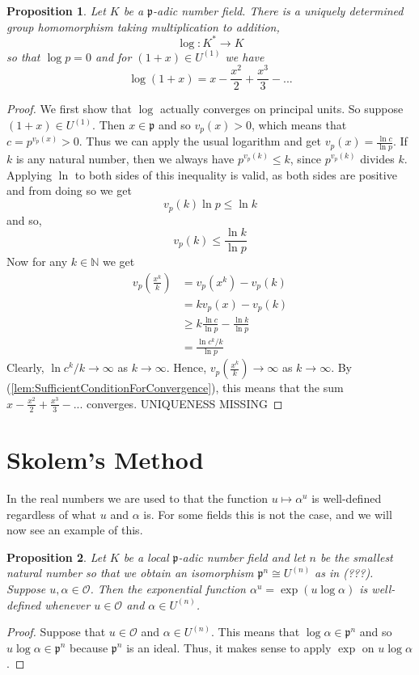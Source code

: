 \documentclass{article}
\newtheorem{proposition}{Proposition}[section]
\newcommand{\mfrak}[1]{\mathfrak{#1}}
\newcommand{\mcal}[1]{\mathcal{#1}}
\newcommand{\mbb}[1]{\mathbb{#1}}
\begin{document}
\begin{proposition}
    Let $K$ be a $\mfrak{p}$-adic number field. There is a uniquely determined group homomorphism taking multiplication to addition,
    $$\log : K^* \to K$$
    so that $\log p = 0$ and for $(1 + x) \in U^{(1)}$ we have
    $$\log (1 + x) = x - \frac{x^2}{2} + \frac{x^3}{3} - ...$$    
\end{proposition}
\begin{proof}
    We first show that $\log$ actually converges on principal units. So suppose $(1 + x) \in U^(1)$. Then $x \in \mfrak p$ and so $v_p(x) > 0$, which means that $c = p^{v_p(x)} > 0$. Thus we can apply the usual logarithm and get $v_p(x) = \frac{\ln c}{\ln p}$. If $k$ is any natural number, then we always have $p^{v_p(k)} \leq k$, since $p^{v_p(k)}$ divides $k$. Applying $\ln$ to both sides of this inequality is valid, as both sides are positive and from doing so we get 
    $$v_p(k) \ln p \leq \ln k$$
    and so,
    $$v_p(k) \leq \frac{\ln k}{\ln p}$$
    Now for any $k \in \mbb N$ we get
    \begin{align*}
        v_p(\frac{x^k}{k}) &= v_p(x^k) - v_p(k)  \\
        &= kv_p(x) - v_p(k) \\
        &\geq k \frac{\ln c}{\ln p} - \frac{\ln k}{\ln p} \\
        &= \frac{\ln c^k / k}{\ln p}
    \end{align*}
    Clearly, $\ln c^k / k \to \infty$ as $k \to \infty$. Hence, $v_p(\frac{x^k}{k}) \to \infty$ as $k \to \infty$. By (\ref{lem:SufficientConditionForConvergence}), this means that the sum $x - \frac{x^2}{2} + \frac{x^3}{3} - ...$ converges. UNIQUENESS MISSING
\end{proof}



\section*{Skolem's Method}
In the real numbers we are used to that the function $u \mapsto \alpha^u$ is well-defined regardless of what $u$ and $\alpha$ is. For some fields this is not the case, and we will now see an example of this. 

\begin{proposition}
    Let $K$ be a local $\mfrak p$-adic number field and let $n$ be the smallest natural number so that we obtain an isomorphism $\mfrak p^n \cong U^{(n)}$ as in (???). Suppose $u,\alpha \in \mcal O$. Then the exponential function $\alpha^u = \exp(u \log \alpha)$ is well-defined whenever $u \in \mcal O$ and $\alpha \in U^{(n)}$.
\end{proposition}
\begin{proof}
    Suppose that $u \in \mcal O$ and $\alpha \in U^{(n)}$. This means that $\log \alpha \in \mfrak p^n$ and so $u \log \alpha \in \mfrak p^n$ because $\mfrak p^n$ is an ideal. Thus, it makes sense to apply $\exp$ on $u \log \alpha$.
\end{proof}
\end{document}
